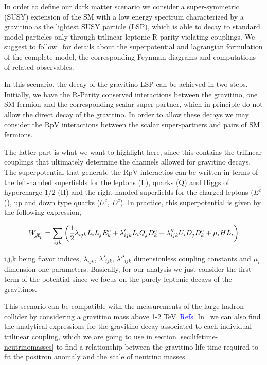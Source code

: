 \documentclass[a4paper,11pt]{article}
\newcommand*{\blue}{\textcolor{blue}}
\begin{document}
In order to define our dark matter scenario we consider a super-symmetric (SUSY) extension of the SM with a low energy spectrum characterized by a gravitino as the lightest SUSY particle (LSP), which is able to decay to standard model particles only through trilinear leptonic R-parity violating couplings. We suggest to follow~\cite{Grefe:2011dp, Moreau:2001sr} for details about the superpotential and lagrangian formulation of the complete model, the corresponding Feynman diagrams and computations of related observables. 

In this scenario, the decay of the gravitino LSP can be achieved in two steps. Initially, we have the R-Parity conserved interactions between the gravitino, one SM fermion and the corresponding scalar super-partner, which in principle do not allow the direct decay of the gravitino. In order to allow these decays we may consider the RpV interactions between the scalar super-partners and pairs of SM fermions. 

The latter part is what we want to highlight here, since this contains the trilinear couplings that ultimately determine the channels allowed for gravitino decays. The superpotential that generate the RpV interactios can be written in terms of the left-handed superfields for the leptons (L), quarks (Q) and Higgs of hypercharge 1/2 (H) and the right-handed superfields for the charged leptons ($E^c$)), up and down type quarks ($U^c$, $D^c$). In practice, this superpotential is given by the following expression,

\begin{equation}
 W_{\cancel{R}_p} = \sum_{ijk}\left(\frac{1}{2}\lambda_{ijk}L_i L_j E_k^c + \lambda'_{ijk}L_i Q_j D_k^c + \lambda''_{ijk}U_i D_j D_k^c + \mu_iHL_i\right)
\end{equation}

\noindent i,j,k being flavor indices, $\lambda_{ijk}$, $\lambda'_{ijk}$, $\lambda''_{ijk}$ dimensionless coupling constants and $\mu_i$ dimension one parameters. Basically, for our analysis we just consider the first term of the potential since we focus on the purely leptonic decays of the gravitinos.

This scenario can be compatible with the measurements of the large hadron collider by considering a gravitino mass above 1-2 TeV~\blue{Refs}. In~\cite{Moreau:2001sr} we can also find the analytical expressions for the gravitino decay associated to each individual trilinear coupling, which we are going to use in section \ref{sec:lifetime-neutrinomasses} to find a relationship between the gravitino life-time required to fit the positron anomaly and the scale of neutrino masses. 
\end{document}
